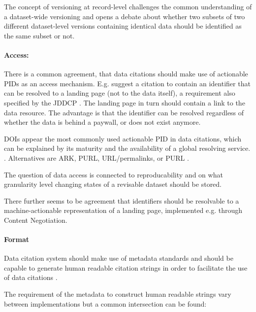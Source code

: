 \documentclass[letterpaper, parskip=half]{scrartcl}
\begin{document}
The concept of versioning at record-level challenges the common understanding of a dataset-wide versioning and opens a debate about whether two subsets of two different dataset-level versions containing identical data should be identified as the same subset or not. 


\paragraph{Access:}
There is a common agreement, that data citations should make use of actionable \glspl{PID} as an access mechanism. E.g. \cite{AltKin07} suggest a citation to contain an identifier that can be resolved to a landing page (not to the data itself), a requirement also specified by the \gls{JDDCP} \citep{Fenner2016}.
The landing page in turn should contain a link to the data resource. The advantage is that the identifier can be resolved regardless of whether the data is behind a paywall, or does not exist anymore.

\glspl{DOI} appear the most commonly used actionable \gls{PID} in data citations, which can be explained by its maturity and the availability of a global resolving service.  \citep{Honor2016}. Alternatives are \gls{ARK}, \gls{PURL}, \gls{URL}/permalinks, or \gls{PURL} \citep{Klump2016, Starr2015}.

The question of data access is connected to reproducability and on what granularity level changing states of a revisable dataset should be stored.


There further seems to be agreement that identifiers should be resolvable to a machine-actionable representation of a landing page, implemented e.g. through Content Negotiation.

\paragraph{Format}
Data citation system should make use of metadata standards \citep{CODATA2013} and should be capable to generate human readable citation strings in order to facilitate the use of data citations \citep{Buneman2016, Rauber2015}. 

The requirement of the metadata to construct human readable strings vary between implementations but a common intersection can be found:
\end{document}
